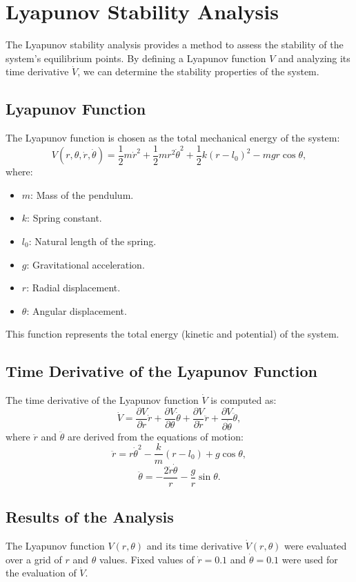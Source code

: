 \documentclass[12pt]{article}
\begin{document}
\section{Lyapunov Stability Analysis}

The Lyapunov stability analysis provides a method to assess the stability of the system's equilibrium points. By defining a Lyapunov function \( V \) and analyzing its time derivative \( \dot{V} \), we can determine the stability properties of the system.

\subsection{Lyapunov Function}
The Lyapunov function is chosen as the total mechanical energy of the system:
\[
V(r, \theta, \dot{r}, \dot{\theta}) = \frac{1}{2} m \dot{r}^2 + \frac{1}{2} m r^2 \dot{\theta}^2 + \frac{1}{2} k (r - l_0)^2 - m g r \cos\theta,
\]
where:
\begin{itemize}
    \item \( m \): Mass of the pendulum.
    \item \( k \): Spring constant.
    \item \( l_0 \): Natural length of the spring.
    \item \( g \): Gravitational acceleration.
    \item \( r \): Radial displacement.
    \item \( \theta \): Angular displacement.
\end{itemize}
This function represents the total energy (kinetic and potential) of the system.

\subsection{Time Derivative of the Lyapunov Function}
The time derivative of the Lyapunov function \( \dot{V} \) is computed as:
\[
\dot{V} = \frac{\partial V}{\partial r} \dot{r} + \frac{\partial V}{\partial \theta} \dot{\theta} + \frac{\partial V}{\partial \dot{r}} \ddot{r} + \frac{\partial V}{\partial \dot{\theta}} \ddot{\theta},
\]
where \( \ddot{r} \) and \( \ddot{\theta} \) are derived from the equations of motion:
\[
\ddot{r} = r \dot{\theta}^2 - \frac{k}{m} (r - l_0) + g \cos\theta,
\]
\[
\ddot{\theta} = -\frac{2 \dot{r} \dot{\theta}}{r} - \frac{g}{r} \sin\theta.
\]

\subsection{Results of the Analysis}
The Lyapunov function \( V(r, \theta) \) and its time derivative \( \dot{V}(r, \theta) \) were evaluated over a grid of \( r \) and \( \theta \) values. Fixed values of \( \dot{r} = 0.1 \) and \( \dot{\theta} = 0.1 \) were used for the evaluation of \( \dot{V} \).
\end{document}
